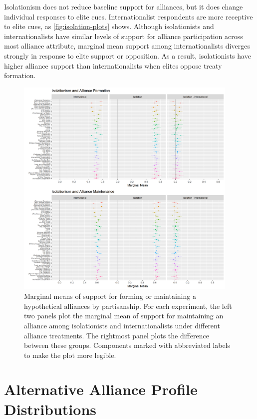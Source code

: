 \documentclass[12pt]{article}
\begin{document}
Isolationism does not reduce baseline support for alliances, but it does change individual responses to elite cues. 
Internationalist respondents are more receptive to elite cues, as \autoref{fig:isolation-plots} shows. 
Although isolationists and internationalists have similar levels of support for alliance participation across most alliance attribute, marginal mean support among internationalists diverges strongly in response to elite support or opposition. 
As a result, isolationists have higher alliance support than internationalists when elites oppose treaty formation. 


\begin{figure}
	\centering
		\includegraphics[width=0.95\textwidth]{isolation-plots.png}
	\caption{Marginal means of support for forming or maintaining a hypothetical alliances by partisanship. For each experiment, the left two panels plot the marginal mean of support for maintaining an alliance among isolationists and internationalists under different alliance treatments. The rightmost panel plots the difference between these groups. Components marked with abbreviated labels to make the plot more legible.}
	\label{fig:isolation-plots}
\end{figure}


\section{Alternative Alliance Profile Distributions}
\end{document}
